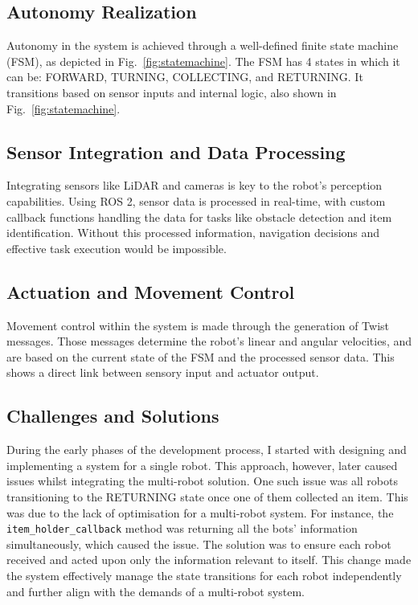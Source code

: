\documentclass[conference]{IEEEtran}
\begin{document}
\subsection{Autonomy Realization}
Autonomy in the system is achieved through a well-defined finite state machine (FSM), as depicted in Fig.~\ref{fig:statemachine}. The FSM has 4 states in which it can be: FORWARD, TURNING, COLLECTING, and RETURNING. It transitions based on sensor inputs and internal logic, also shown in Fig.~\ref{fig:statemachine}.

\subsection{Sensor Integration and Data Processing}
Integrating sensors like LiDAR and cameras is key to the robot's perception capabilities. Using ROS 2, sensor data is processed in real-time, with custom callback functions handling the data for tasks like obstacle detection and item identification. Without this processed information, navigation decisions and effective task execution would be impossible.

\subsection{Actuation and Movement Control}
Movement control within the system is made through the generation of Twist messages. Those messages determine the robot's linear and angular velocities, and are based on the current state of the FSM and the processed sensor data. This shows a direct link between sensory input and actuator output.

\subsection{Challenges and Solutions}
During the early phases of the development process, I started with designing and implementing a system for a single robot. This approach, however, later caused issues whilst integrating the multi-robot solution. One such issue was all robots transitioning to the RETURNING state once one of them collected an item. This was due to the lack of optimisation for a multi-robot system. For instance, the \texttt{item\_holder\_callback} method was returning all the bots' information simultaneously, which caused the issue. The solution was to ensure each robot received and acted upon only the information relevant to itself. This change made the system effectively manage the state transitions for each robot independently and further align with the demands of a multi-robot system. 
\end{document}
